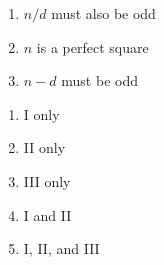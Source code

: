 \begin{multienumerate}
{\begin{enumerate}[label=\Roman*.]
\item $n/d$ must also be odd
\item $n$ is a perfect square
\item $n-d$ must be odd
\end{enumerate}

\begin{enumerate}[label=(\Alph*)]
\item I only
\item II only
\item III only
\item I and II
\item I, II, and III
\end{enumerate}}
\end{multienumerate}